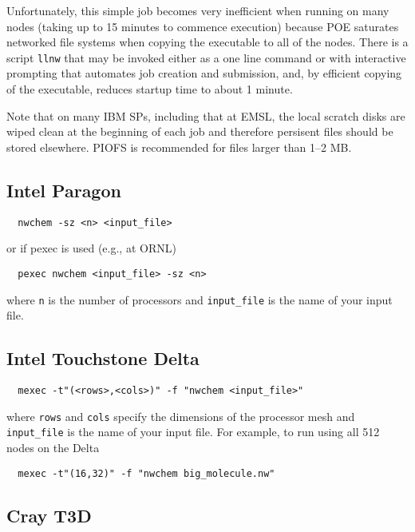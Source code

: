 Unfortunately, this simple job becomes very inefficient when running
on many nodes (taking up to 15 minutes to commence execution) because
POE saturates networked file systems when copying the executable to
all of the nodes.  There is a script \verb+llnw+ that may be invoked
either as a one line command or with interactive prompting that
automates job creation and submission, and, by efficient copying of the
executable, reduces startup time to about 1 minute.

Note that on many IBM SPs, including that at EMSL, the local scratch
disks are wiped clean at the beginning of each job and therefore
persisent files should be stored elsewhere.  PIOFS is recommended for
files larger than 1--2 MB.

\subsection{Intel Paragon}

\begin{verbatim}
  nwchem -sz <n> <input_file>
\end{verbatim}

or if pexec is used (e.g., at ORNL)

\begin{verbatim}
  pexec nwchem <input_file> -sz <n>
\end{verbatim}

where \verb+n+ is the number of processors and \verb+input_file+ is the
name of your input file.


\subsection{Intel Touchstone Delta}

\begin{verbatim}
  mexec -t"(<rows>,<cols>)" -f "nwchem <input_file>"
\end{verbatim}

where \verb+rows+ and \verb+cols+ specify the dimensions of the
processor mesh and \verb+input_file+ is the name of your input file.
For example, to run using all 512 nodes on the Delta
\begin{verbatim}
  mexec -t"(16,32)" -f "nwchem big_molecule.nw"
\end{verbatim}

\subsection{Cray T3D}

